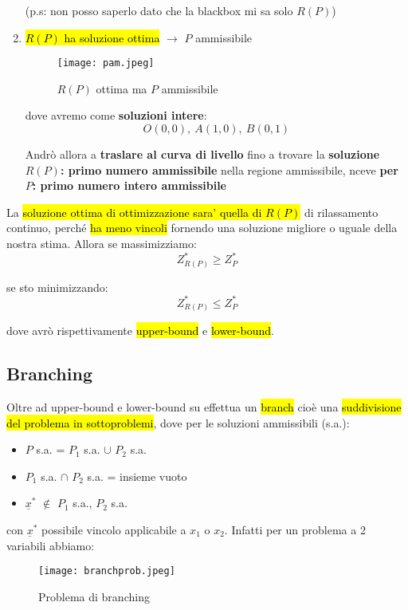 \begin{enumerate}
        (p.s: non posso saperlo dato che la blackbox mi sa solo $R(P)$)

    \item \hl{$R(P)$ ha soluzione ottima} $\to$ $P$ ammissibile
        
        \begin{figure}[H]
        \centering
        \texttt{[image: pam.jpeg]}
        \caption{$R(P)$ ottima ma $P$ ammissibile} 
        \label{pam}
        \end{figure}

        dove avremo come \textbf{soluzioni intere}:
        $$O(0,0),\ A(1,0),\ B(0, 1)$$

        Andrò allora a \textbf{traslare al curva di livello} fino a trovare la \textbf{soluzione $R(P)$: primo numero ammissibile} nella regione ammissibile, nceve \textbf{per $P$: primo numero intero ammissibile}

\end{enumerate}

La \hl{soluzione ottima di ottimizzazione sara' quella di $R(P)$} di rilassamento continuo, perché \hl{ha meno vincoli} fornendo una soluzione migliore o uguale della nostra stima. Allora se massimizziamo:
$$Z^*_{R(P)} \geq Z^*_P$$

se sto minimizzando:
$$Z^*_{R(P)} \leq Z^*_P$$

dove avrò rispettivamente \hl{upper-bound} e \hl{lower-bound}.


\subsection{Branching}

Oltre ad upper-bound e lower-bound su effettua un \hl{branch} cioè una \hl{suddivisione del problema in sottoproblemi}, dove per le soluzioni ammissibili (s.a.):

\begin{itemize}
    \item $P$ s.a. = $P_1$ s.a. $\cup$ $P_2$ s.a.
    \item $P_1$ s.a. $\cap$ $P_2$ s.a. = insieme vuoto
    \item $\underline{x}^*$ $\notin$ $P_1$ s.a., $P_2$ s.a.
\end{itemize}

con $\underline{x}^*$ possibile vincolo applicabile a $x_1$ o $x_2$. Infatti per un problema a 2 variabili abbiamo:

\begin{figure}[H]
\centering
\texttt{[image: branchprob.jpeg]}
\caption{Problema di branching} 
\label{branchprob}
\end{figure}

